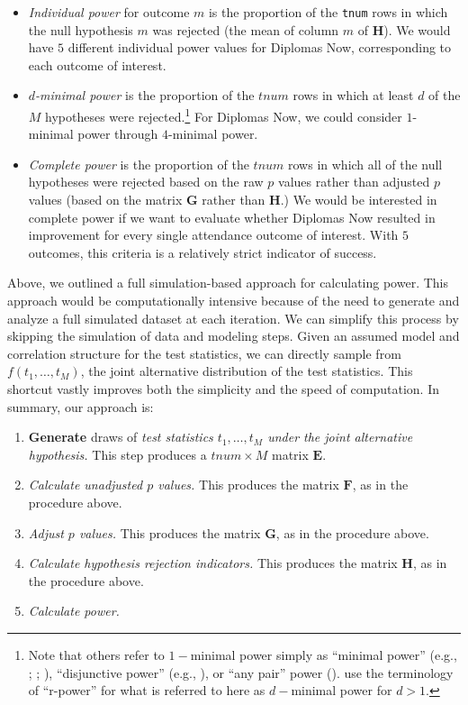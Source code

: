 \documentclass[
]{jss}
\providecommand{\tightlist}{%
  \setlength{\itemsep}{0pt}\setlength{\parskip}{0pt}}
\begin{document}
\begin{itemize}
\item
  \emph{Individual power} for outcome \(m\) is the proportion of the
  \texttt{tnum} rows in which the null hypothesis \(m\) was rejected
  (the mean of column \(m\) of \(\mathbf{H}\)). We would have \(5\)
  different individual power values for Diplomas Now, corresponding to
  each outcome of interest.
\item
  \emph{\(d\)-minimal power} is the proportion of the \(tnum\) rows in
  which at least \(d\) of the \(M\) hypotheses were rejected.\footnote{Note
    that others refer to \(1-\)minimal power simply as ``minimal power''
    (e.g., \citet{RN33095}; \citet{RN23882}; \citet{MTSAS}),
    ``disjunctive power'' (e.g., \citet{RN33091}), or ``any pair'' power
    (\citet{RN33097}). \citet{RN23882} use the terminology of
    ``r-power'' for what is referred to here as \(d-\)minimal power for
    \(d>1\).} For Diplomas Now, we could consider \(1\)-minimal power
  through \(4\)-minimal power.
\item
  \emph{Complete power} is the proportion of the \(tnum\) rows in which
  all of the null hypotheses were rejected based on the raw \(p\) values
  rather than adjusted \(p\) values (based on the matrix \(\mathbf{G}\)
  rather than \(\mathbf{H}\).) We would be interested in complete power
  if we want to evaluate whether Diplomas Now resulted in improvement
  for every single attendance outcome of interest. With \(5\) outcomes,
  this criteria is a relatively strict indicator of success.
\end{itemize}

Above, we outlined a full simulation-based approach for calculating
power. This approach would be computationally intensive because of the
need to generate and analyze a full simulated dataset at each iteration.
We can simplify this process by skipping the simulation of data and
modeling steps. Given an assumed model and correlation structure for the
test statistics, we can directly sample from \(f(t_1, \dots, t_M)\), the
joint alternative distribution of the test statistics. This shortcut
vastly improves both the simplicity and the speed of computation. In
summary, our approach is:

\begin{enumerate}
\def\labelenumi{\arabic{enumi}.}
\tightlist
\item
  \textbf{Generate} draws of \emph{test statistics \(t_1, \dots, t_M\)
  under the joint alternative hypothesis.} This step produces a
  \(tnum \times M\) matrix \(\mathbf{E}\).
\item
  \emph{Calculate unadjusted \(p\) values.} This produces the matrix
  \(\mathbf{F}\), as in the procedure above.
\item
  \emph{Adjust \(p\) values.} This produces the matrix \(\mathbf{G}\),
  as in the procedure above.
\item
  \emph{Calculate hypothesis rejection indicators.} This produces the
  matrix \(\mathbf{H}\), as in the procedure above.
\item
  \emph{Calculate power.}
\end{enumerate}
\end{document}
